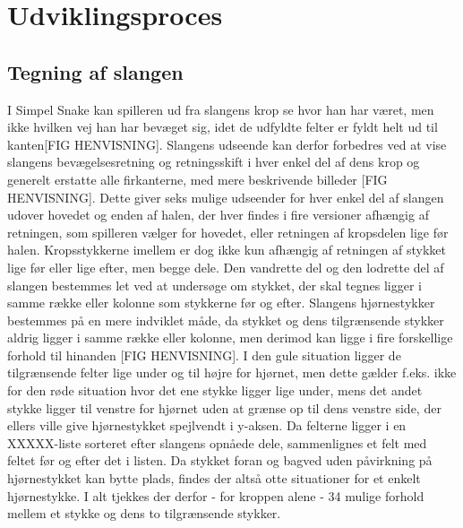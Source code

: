 \documentclass{report}
\begin{document}
\section{Udviklingsproces}

\subsection{Tegning af slangen}
I Simpel Snake kan spilleren ud fra slangens krop se hvor han har været, men ikke hvilken vej han har bevæget sig, idet de udfyldte felter er fyldt helt ud til kanten[FIG HENVISNING]. Slangens udseende kan derfor forbedres ved at vise slangens bevægelsesretning og retningsskift i hver enkel del af dens krop og generelt erstatte alle firkanterne, med mere beskrivende billeder [FIG HENVISNING]. Dette giver seks mulige udseender for hver enkel del af slangen udover hovedet og enden af halen, der hver findes i fire versioner afhængig af retningen, som spilleren vælger for hovedet, eller retningen af kropsdelen lige før halen. Kropsstykkerne imellem er dog ikke kun afhængig af retningen af stykket lige før eller lige efter, men begge dele. Den vandrette del og den lodrette del af slangen bestemmes let ved at undersøge om stykket, der skal tegnes ligger i samme række eller kolonne som stykkerne før og efter. Slangens hjørnestykker bestemmes på en mere indviklet måde, da stykket og dens tilgrænsende stykker aldrig ligger i samme række eller kolonne, men derimod kan ligge i fire forskellige forhold til hinanden [FIG HENVISNING]. I den gule situation ligger de tilgrænsende felter lige under og til højre for hjørnet, men dette gælder f.eks. ikke for den røde situation hvor det ene stykke ligger lige under, mens det andet stykke ligger til venstre for hjørnet uden at grænse op til dens venstre side, der ellers ville give hjørnestykket spejlvendt i y-aksen. Da felterne ligger i en XXXXX-liste sorteret efter slangens opnåede dele, sammenlignes et felt med feltet før og efter det i listen. Da stykket foran og bagved uden påvirkning på hjørnestykket kan bytte plads, findes der altså otte situationer for et enkelt hjørnestykke. I alt tjekkes der derfor - for kroppen alene - 34 mulige forhold mellem et stykke og dens to tilgrænsende stykker.
\linebreak
\end{document}
